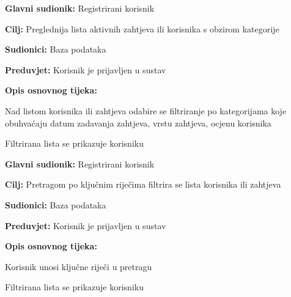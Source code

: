 \noindent {}
\begin{packed_item}
	
	\item \textbf{Glavni sudionik: } Registrirani korisnik
	\item  \textbf{Cilj:} Preglednija lista aktivnih zahtjeva ili korisnika s obzirom kategorije 
	\item  \textbf{Sudionici:} Baza podataka
	\item  \textbf{Preduvjet:} Korisnik je prijavljen u sustav
	\item  \textbf{Opis osnovnog tijeka:}
	
	\item[] \begin{packed_enum}
		
		\item Nad listom korisnika ili zahtjeva odabire se filtriranje po kategorijama koje obuhvaćaju datum zadavanja zahtjeva, vrstu zahtjeva, ocjenu korisnika
		\item Filtrirana lista se prikazuje korisniku
	\end{packed_enum}
	
\end{packed_item}

\noindent {}
\begin{packed_item}
	
	\item \textbf{Glavni sudionik: } Registrirani korisnik
	\item  \textbf{Cilj:} Pretragom po ključnim riječima filtrira se lista korisnika ili zahtjeva
	\item  \textbf{Sudionici:} Baza podataka
	\item  \textbf{Preduvjet:} Korisnik je prijavljen u sustav
	\item  \textbf{Opis osnovnog tijeka:}
	
	\item[] \begin{packed_enum}
		
		\item Korisnik unosi ključne riječi u pretragu 
		\item Filtrirana lista se prikazuje korisniku
	\end{packed_enum}
	
\end{packed_item}

